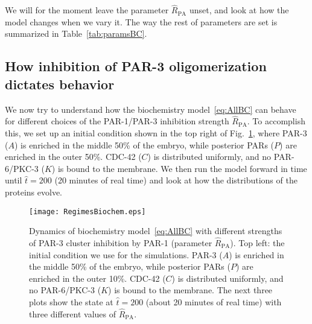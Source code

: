 \documentclass[11pt]{article}
\newcommand{\6}[1]{#1_{\text{6}}}
\newcommand{\3}[1]{#1_{\text{3}}}
\begin{document}
We will for the moment leave the parameter $\hat R_\text{PA}$ unset, and look at how the model changes when we vary it. The way the rest of parameters are set is summarized in Table\ \ref{tab:paramsBC}.

\subsection{How inhibition of PAR-3 oligomerization dictates behavior}
We now try to understand how the biochemistry model\ \eqref{eq:AllBC} can behave for different choices of the PAR-1/PAR-3 inhibition strength $\hat R_\text{PA}$. To accomplish this, we set up an initial condition shown in the top right of Fig.\ \ref{fig:BCRegimes}, where PAR-3 ($A$) is enriched in the middle 50\% of the embryo, while posterior PARs ($P$) are enriched in the outer 50\%. CDC-42 ($C$) is distributed uniformly, and no PAR-6/PKC-3 ($K$) is bound to the membrane. We then run the model forward in time until $\hat t = 200$ (20 minutes of real time) and look at how the distributions of the proteins evolve. 

\begin{figure}
\centering
\texttt{[image: RegimesBiochem.eps]}
\caption{\label{fig:BCRegimes}Dynamics of biochemistry model\ \eqref{eq:AllBC} with different strengths of PAR-3 cluster inhibition by PAR-1 (parameter $\hat R_\text{PA}$). Top left: the initial condition we use for the simulations. PAR-3 ($A$) is enriched in the middle 50\% of the embryo, while posterior PARs ($P$) are enriched in the outer 10\%. CDC-42 ($C$) is distributed uniformly, and no PAR-6/PKC-3 ($K$) is bound to the membrane. The next three plots show the state at $\hat t = 200$ (about 20 minutes of real time) with three different values of $\hat R_\text{PA}$. }
\end{figure}
\end{document}
